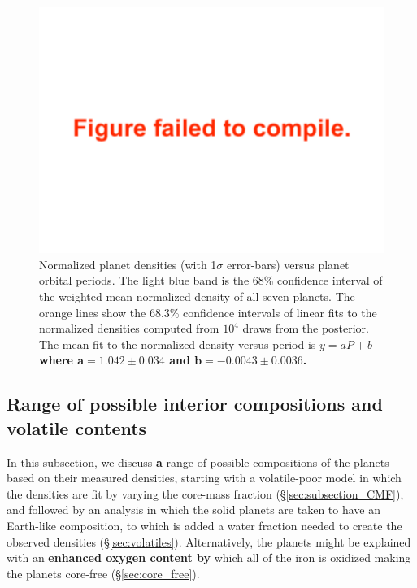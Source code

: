 \documentclass[twocolumn]{aastex63}
\begin{document}
\begin{figure}
    \centering
    \includegraphics[width=\hsize]{figures/Norm_dens_vs_period.pdf}
    {Normalized planet densities (with 1$\sigma$ error-bars) versus planet orbital periods. The light blue band is the 68\% confidence interval of the weighted mean normalized density of all seven planets.  The orange lines show the 68.3\% confidence intervals of linear fits to the normalized densities computed from $10^4$
        draws from the posterior.  The mean fit to the normalized density versus period is \textbf{$y = a P + b$ where $\mathbf{a= 1.042{\pm}0.034}$ and $\mathbf{b=-0.0043{\pm}0.0036}$.}}
    \label{fig:norm_density_vs_period}
\end{figure}


\subsection{Range of possible interior compositions and volatile contents}  \label{sec:interior_compositions}

In this subsection, we discuss \textbf{a} range of possible compositions of the planets based on their measured densities,
starting with a volatile-poor model in which the densities are fit by varying the core-mass fraction (\S \ref{sec:subsection_CMF}),
and followed by an analysis in which the solid planets are taken to have an Earth-like composition, to which is added a water fraction needed to create the observed densities (\S \ref{sec:volatiles}). %
Alternatively, the planets might be explained with an \textbf{enhanced oxygen content by} which all of the iron is oxidized making the planets core-free (\S \ref{sec:core_free}).
\end{document}
